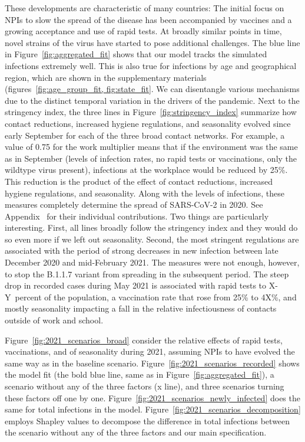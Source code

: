 These developments are characteristic of many countries: The initial focus on NPIs to slow the spread of the disease has been accompanied by vaccines and a growing acceptance and use of rapid tests. At broadly similar points in time, novel strains of the virus have started to pose additional challenges. The blue line in Figure~\ref{fig:aggregated_fit} shows that our model tracks the simulated infections extremely well. This is also true for infections by age and geographical region, which are shown in the supplementary materials (figures~\ref{fig:age_group_fit, fig:state_fit}. We can disentangle various mechanisms due to the distinct temporal variation in the drivers of the pandemic. Next to the stringency index, the three lines in Figure~\ref{fig:stringency_index} summarize how contact reductions, increased hygiene regulations, and seasonality evolved since early September for each of the three broad contact networks. For example, a value of 0.75 for the work multiplier means that if the environment was the same as in September (levels of infection rates, no rapid tests or vaccinations, only the wildtype virus present), infections at the workplace would be reduced by 25\%. This reduction is the product of the effect of contact reductions, increased hygiene regulations, and seasonality. Along with the levels of infections, these measures completely determine the spread of SARS-CoV-2 in 2020. See Appendix~  for their individual contributions. Two things are particularly interesting. First, all lines broadly follow the stringency index and they would do so even more if we left out seasonality. Second, the most stringent regulations are associated with the period of strong decreases in new infection between late December 2020 and mid-February 2021. The measures were not enough, however, to stop the B.1.1.7 variant from spreading in the subsequent period. The steep drop in recorded cases during May 2021 is associated with rapid tests to X-Y~percent of the population, a vaccination rate that rose from 25\% to 4X\%, and mostly seasonality impacting a fall in the relative infectiousness of contacts outside of work and school.

Figure~\ref{fig:2021_scenarios_broad} consider the relative effects of rapid tests, vaccinations, and of seasonality during 2021, assuming NPIs to have evolved the same way as in the baseline scenario. Figure~\ref{fig:2021_scenarios_recorded} shows the model fit (the bold blue line, same as in Figure~\ref{fig:aggregated_fit}), a scenario without any of the three factors (x line), and three scenarios turning these factors off one by one. Figure~\ref{fig:2021_scenarios_newly_infected} does the same for total infections in the model. Figure~\ref{fig:2021_scenarios_decomposition} employs Shapley values to decompose the difference in total infections between the scenario without any of the three factors and our main specification.

